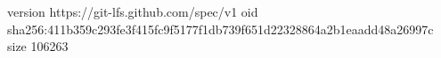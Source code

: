 version https://git-lfs.github.com/spec/v1
oid sha256:411b359c293fe3f415fc9f5177f1db739f651d22328864a2b1eaadd48a26997c
size 106263

